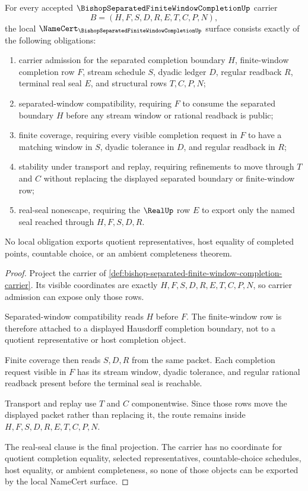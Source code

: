 \begin{theorem}
\label{thm:bishop-separated-finite-window-completion-namecert-obligations}
For every accepted $\BishopSeparatedFiniteWindowCompletionUp$ carrier
$$
B=(H,F,S,D,R,E,T,C,P,N),
$$
the local $\NameCert_{\BishopSeparatedFiniteWindowCompletionUp}$ surface consists exactly of the following obligations:
\begin{enumerate}
\item carrier admission for the separated completion boundary $H$, finite-window completion row $F$, stream schedule $S$, dyadic ledger $D$, regular readback $R$, terminal real seal $E$, and structural rows $T,C,P,N$;
\item separated-window compatibility, requiring $F$ to consume the separated boundary $H$ before any stream window or rational readback is public;
\item finite coverage, requiring every visible completion request in $F$ to have a matching window in $S$, dyadic tolerance in $D$, and regular readback in $R$;
\item stability under transport and replay, requiring refinements to move through $T$ and $C$ without replacing the displayed separated boundary or finite-window row;
\item real-seal nonescape, requiring the $\RealUp$ row $E$ to export only the named seal reached through $H,F,S,D,R$.
\end{enumerate}
No local obligation exports quotient representatives, host equality of completed points, countable choice, or an ambient completeness theorem.
\end{theorem}
\begin{proof}
Project the carrier of \autoref{def:bishop-separated-finite-window-completion-carrier}. Its visible coordinates are exactly $H,F,S,D,R,E,T,C,P,N$, so carrier admission can expose only those rows.

Separated-window compatibility reads $H$ before $F$. The finite-window row is therefore attached to a displayed Hausdorff completion boundary, not to a quotient representative or host completion object.

Finite coverage then reads $S,D,R$ from the same packet. Each completion request visible in $F$ has its stream window, dyadic tolerance, and regular rational readback present before the terminal seal is reachable.

Transport and replay use $T$ and $C$ componentwise. Since those rows move the displayed packet rather than replacing it, the route remains inside $H,F,S,D,R,E,T,C,P,N$.

The real-seal clause is the final projection. The carrier has no coordinate for quotient completion equality, selected representatives, countable-choice schedules, host equality, or ambient completeness, so none of those objects can be exported by the local NameCert surface.
\end{proof}

